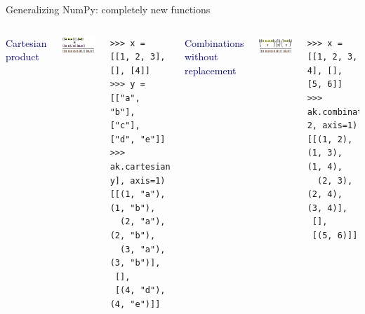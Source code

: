 \documentclass[aspectratio=169]{beamer}
\begin{document}
\begin{frame}[fragile]{Generalizing NumPy: completely new functions}
\scriptsize
\vspace{0.5 cm}

\begin{columns}
\textcolor{darkblue}{\Large Cartesian product}

\includegraphics[width=\linewidth]{img/cartoon-cartesian.pdf}

\begin{verbatim}
>>> x = [[1, 2, 3], [], [4]]
>>> y = [["a", "b"], ["c"], ["d", "e"]]
>>> ak.cartesian([x, y], axis=1)
[[(1, "a"), (1, "b"),
  (2, "a"), (2, "b"),
  (3, "a"), (3, "b")],
 [],
 [(4, "d"), (4, "e")]]
\end{verbatim}

\textcolor{darkblue}{\Large Combinations without replacement}

\includegraphics[width=\linewidth]{img/cartoon-combinations.pdf}

\begin{verbatim}
>>> x = [[1, 2, 3, 4], [], [5, 6]]
>>> ak.combinations(x, 2, axis=1)
[[(1, 2), (1, 3), (1, 4),
  (2, 3), (2, 4), (3, 4)],
 [],
 [(5, 6)]]
\end{verbatim}
\vspace{\baselineskip}
\end{columns}
\end{frame}
\end{document}

